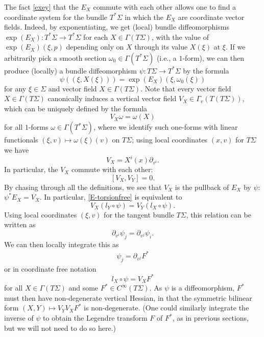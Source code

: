 \documentclass{article}
\numberwithin{equation}{section}
\theoremstyle{plain}
\begin{document}
\smallskip

The fact \eqref{exey} that the $E_X$ commute with each other allows one to find a coordinate system for the bundle $T^*\Sigma$ in which the $E_X$ are coordinate vector fields.  Indeed, by exponentiating, we get (local) bundle diffeomorphisms $\exp(E_X): T^*\Sigma \to T^*\Sigma$ for each $X \in \Gamma(T\Sigma)$, with the value of $\exp(E_X)(\xi,p)$ depending only on $X$ through its value $X(\xi)$ at $\xi$.  If we arbitrarily pick a smooth section $\omega_0 \in \Gamma(T^*\Sigma)$ (i.e., a $1$-form), we can then produce (locally) a bundle diffeomorphism $\psi : T \Sigma \to T^* \Sigma$ by the formula
$$ \psi( (\xi, X(\xi)) ) = \exp(E_X)(\xi,\omega_0(\xi))$$
for any $\xi \in \Sigma$ and vector field $X \in \Gamma(T\Sigma)$.  Note that every vector field $X \in \Gamma(T\Sigma)$ canonically induces a vertical vector field $V_X \in \Gamma_v(T(T\Sigma))$, which can be uniquely defined by the formula
$$ V_X \omega = \omega(X)$$
for all $1$-forms $\omega \in \Gamma(T^*\Sigma)$, where we identify such one-forms with linear functionals $(\xi,v) \mapsto \omega(\xi)(v)$ on $T\Sigma$; using local coordinates $(x,v)$ for $T\Sigma$ we have
$$ V_X = X^i(x) \partial_{v^i}.$$
In particular, the $V_X$ commute with each other:
\begin{equation}\label{vx-comm}
[V_X, V_Y] = 0.
\end{equation}
By chasing through all the definitions, we see that $V_X$ is the pullback of $E_X$ by $\psi$: $\psi^* E_X = V_X$.  In particular, \eqref{E-torsionfree} is equivalent to
\begin{equation}\label{vxvy}
    V_X (l_Y \circ \psi) = V_Y (l_X \circ \psi).
\end{equation}
Using local coordinates $(\xi,v)$ for the tangent bundle $T\Sigma$, this relation can be written as
$$ \partial_{v^i} \psi_j = \partial_{v^j} \psi_i.$$
We can then locally integrate this as
\begin{align}\label{260604leD-21}
    \psi_j = \partial_{v^j} F^*
\end{align} 
or in coordinate free notation
\begin{equation}\label{lxf}
     l_X \circ \psi = V_X F^*
\end{equation}
for all $X \in \Gamma(T\Sigma)$ and some $F^* \in C^\infty(T\Sigma)$.  As $\psi$ is a diffeomorphism, $F^*$ must then have non-degenerate vertical Hessian, in that the symmetric bilinear form $(X,Y) \mapsto V_Y V_X F^*$ is non-degenerate.  (One could similarly integrate the inverse of $\psi$ to obtain the Legendre transform $F$ of $F^*$, as in previous sections, but we will not need to do so here.)\\
\end{document}

